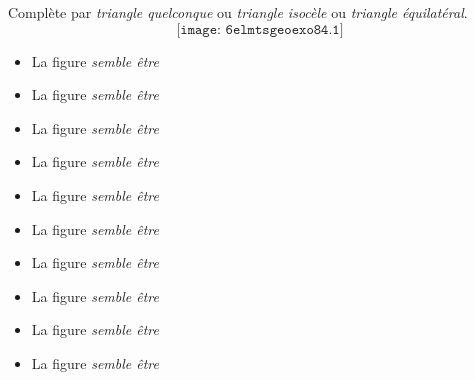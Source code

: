 Complète par {\em triangle quelconque} ou {\em triangle isocèle} ou
{\em triangle équilatéral}.
\[\texttt{[image: 6elmtsgeoexo84.1]}\]
\begin{multicols}{2}
  \begin{itemize}
  \item La figure  {\em semble être } \dotfill
  \item La figure  {\em semble être } \dotfill
  \item La figure  {\em semble être } \dotfill
  \item La figure  {\em semble être } \dotfill 
  \item La figure  {\em semble être } \dotfill
  \item La figure  {\em semble être } \dotfill
  \item La figure  {\em semble être } \dotfill
  \item La figure  {\em semble être } \dotfill
  \item La figure  {\em semble être } \dotfill
  \item La figure  {\em semble être } \dotfill
  \end{itemize}
\end{multicols}
